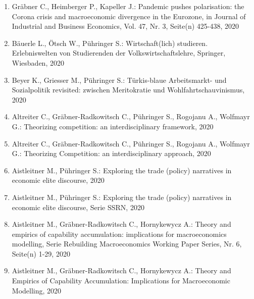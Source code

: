 \begin{enumerate}
	 \item Gräbner C., Heimberger P., Kapeller J.: Pandemic pushes polarisation: the Corona crisis and macroeconomic divergence in the Eurozone, in Journal of Industrial and Business Economics, Vol. 47, Nr. 3, Seite(n) 425-438, 2020
	 \item Bäuerle L., Ötsch W., Pühringer S.: Wirtschaft(lich) studieren. Erlebniswelten von Studierenden der Volkswirtschaftslehre, Springer, Wiesbaden, 2020
	 \item Beyer K., Griesser M., Pühringer S.: Türkis-blaue Arbeitsmarkt- und Sozialpolitik revisited: zwischen Meritokratie und Wohlfahrtschauvinismus, 2020
	 \item Altreiter C., Gräbner-Radkowitsch C., Pühringer S., Rogojanu A., Wolfmayr G.: Theorizing competition: an interdisciplinary framework, 2020
	 \item Altreiter C., Gräbner-Radkowitsch C., Pühringer S., Rogojanu A., Wolfmayr G.: Theorizing Competition: an interdisciplinary approach, 2020
	 \item Aistleitner M., Pühringer S.: Exploring the trade (policy) narratives in economic elite discourse, 2020
	 \item Aistleitner M., Pühringer S.: Exploring the trade (policy) narratives in economic elite discourse, Serie SSRN, 2020
	 \item Aistleitner M., Gräbner-Radkowitsch C., Hornykewycz A.: Theory and empirics of capability accumulation: implications for macroeconomics modelling, Serie Rebuilding Macroeconomics Working Paper Series, Nr. 6, Seite(n) 1-29, 2020
	 \item Aistleitner M., Gräbner-Radkowitsch C., Hornykewycz A.: Theory and Empirics of Capability Accumulation: Implications for Macroeconomic Modelling, 2020
\end{enumerate}
